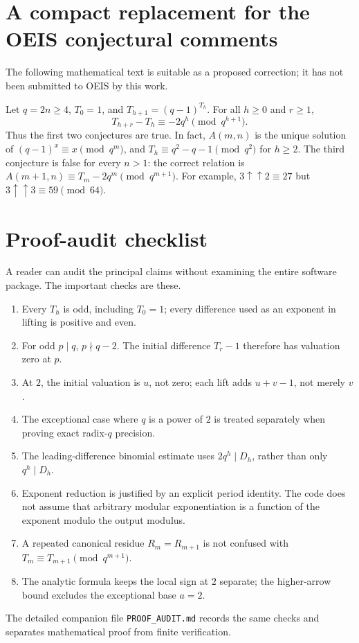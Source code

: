 \documentclass[11pt,a4paper]{article}
\numberwithin{equation}{section}
\theoremstyle{plain}
\theoremstyle{definition}
\begin{document}
\appendix
\section{A compact replacement for the OEIS conjectural comments}
The following mathematical text is suitable as a proposed correction;
it has not been submitted to OEIS by this work.

\begin{resultbox}
Let $q=2n\ge4$, $T_0=1$, and $T_{h+1}=(q-1)^{T_h}$.
For all $h\ge0$ and $r\ge1$,
\[
 T_{h+r}-T_h\equiv-2q^h\pmod{q^{h+1}}.
\]
Thus the first two conjectures are true.  In fact, $A(m,n)$ is the
unique solution of $(q-1)^x\equiv x\pmod{q^m}$, and
$T_h\equiv q^2-q-1\pmod{q^2}$ for $h\ge2$.
The third conjecture is false for every $n>1$: the correct relation is
$A(m+1,n)\equiv T_m-2q^m\pmod{q^{m+1}}$.
For example, $3\uparrow\uparrow2\equiv27$ but
$3\uparrow\uparrow3\equiv59\pmod{64}$.
\end{resultbox}

\section{Proof-audit checklist}
A reader can audit the principal claims without examining the entire
software package.  The important checks are these.
\begin{enumerate}[leftmargin=7mm,itemsep=3pt]
\item Every $T_h$ is odd, including $T_0=1$; every difference used as
an exponent in lifting is positive and even.
\item For odd $p\mid q$, $p\nmid q-2$.  The initial difference
$T_r-1$ therefore has valuation zero at $p$.
\item At $2$, the initial valuation is $u$, not zero; each lift adds
$u+v-1$, not merely $v$.
\item The exceptional case where $q$ is a power of $2$ is treated
separately when proving exact radix-$q$ precision.
\item The leading-difference binomial estimate uses
$2q^h\mid D_h$, rather than only $q^h\mid D_h$.
\item Exponent reduction is justified by an explicit period identity.
The code does not assume that arbitrary modular exponentiation is a
function of the exponent modulo the output modulus.
\item A repeated canonical residue $R_m=R_{m+1}$ is not confused with
$T_m\equiv T_{m+1}\pmod{q^{m+1}}$.
\item The analytic formula keeps the local sign at $2$ separate;
the higher-arrow bound excludes the exceptional base $a=2$.
\end{enumerate}
The detailed companion file \texttt{PROOF\_AUDIT.md} records the same
checks and separates mathematical proof from finite verification.
\end{document}
